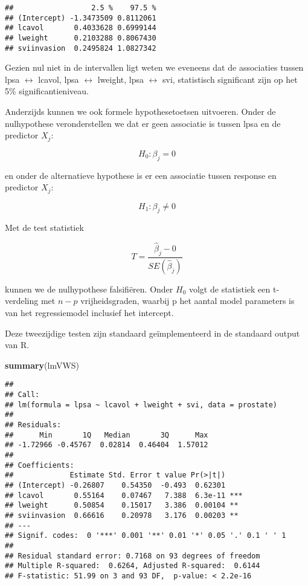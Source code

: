 \documentclass[
  12pt,dutch,coursenotes]{book}
\newenvironment{Shaded}{\begin{snugshade}}{\end{snugshade}}
\newcommand{\KeywordTok}[1]{\textcolor[rgb]{0.13,0.29,0.53}{\textbf{#1}}}
\newcommand{\NormalTok}[1]{#1}
\theoremstyle{definition}
\theoremstyle{definition}
\theoremstyle{definition}
\theoremstyle{remark}
\begin{document}
\begin{verbatim}
##                  2.5 %    97.5 %
## (Intercept) -1.3473509 0.8112061
## lcavol       0.4033628 0.6999144
## lweight      0.2103288 0.8067430
## sviinvasion  0.2495824 1.0827342
\end{verbatim}

Gezien nul niet in de intervallen ligt weten we eveneens dat de associaties tussen lpsa \(\leftrightarrow\) lcavol, lpsa \(\leftrightarrow\) lweight, lpsa \(\leftrightarrow\) svi, statistisch significant zijn op het 5\% significantieniveau.

Anderzijds kunnen we ook formele hypothesetoetsen uitvoeren. Onder de nulhypothese veronderstellen we dat er geen associatie is tussen lpsa en de predictor \(X_j\):

\[H_0: \beta_j=0\]

en onder de alternatieve hypothese is er een associatie tussen response en predictor \(X_j\):

\[H_1: \beta_j\neq0\]

Met de test statistiek

\[T=\frac{\hat{\beta}_j-0}{SE(\hat{\beta}_j)}\]

kunnen we de nulhypothese falsifiëren. Onder \(H_0\) volgt de statistiek een t-verdeling met \(n-p\) vrijheidsgraden, waarbij p het aantal model parameters is van het regressiemodel inclusief het intercept.

Deze tweezijdige testen zijn standaard geïmplementeerd in de standaard output van R.

\begin{Shaded}
\begin{Highlighting}[]
\KeywordTok{summary}\NormalTok{(lmVWS)}
\end{Highlighting}
\end{Shaded}

\begin{verbatim}
## 
## Call:
## lm(formula = lpsa ~ lcavol + lweight + svi, data = prostate)
## 
## Residuals:
##      Min       1Q   Median       3Q      Max 
## -1.72966 -0.45767  0.02814  0.46404  1.57012 
## 
## Coefficients:
##             Estimate Std. Error t value Pr(>|t|)    
## (Intercept) -0.26807    0.54350  -0.493  0.62301    
## lcavol       0.55164    0.07467   7.388  6.3e-11 ***
## lweight      0.50854    0.15017   3.386  0.00104 ** 
## sviinvasion  0.66616    0.20978   3.176  0.00203 ** 
## ---
## Signif. codes:  0 '***' 0.001 '**' 0.01 '*' 0.05 '.' 0.1 ' ' 1
## 
## Residual standard error: 0.7168 on 93 degrees of freedom
## Multiple R-squared:  0.6264, Adjusted R-squared:  0.6144 
## F-statistic: 51.99 on 3 and 93 DF,  p-value: < 2.2e-16
\end{verbatim}
\end{document}
